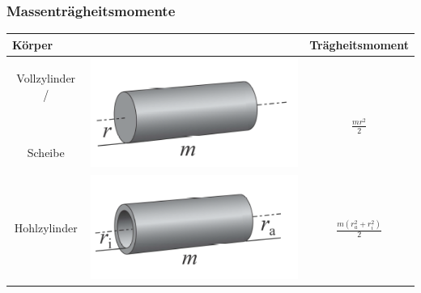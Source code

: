 		\subsubsection{Massenträgheitsmomente}\label{Massenträgheitsmomente}
			\begin{tabular}{|c|c|c|} \hline
				\multicolumn{2}{|l|}{\textbf{Körper}} & \textbf{Trägheitsmoment} \\ \hline
				& \multirow{5}{8em}{\includegraphics[width=\linewidth]{Bilder/massentraegheitsmomente-vollz.png}} & \\
				Vollzylinder / & & \\
				& & $ \frac{m r^2}{2} $\\
				Scheibe & & \\
				& & \\ \hline
				& \multirow{5}{8em}{\includegraphics[width=\linewidth]{Bilder/massentraegheitsmomente-hohlz.png}} & \\
				& & \\
				Hohlzylinder & & $ \frac{m (r^2_a  + r^2_i)}{2} $\\
				& & \\
				& & \\ \hline

\end{tabular}
